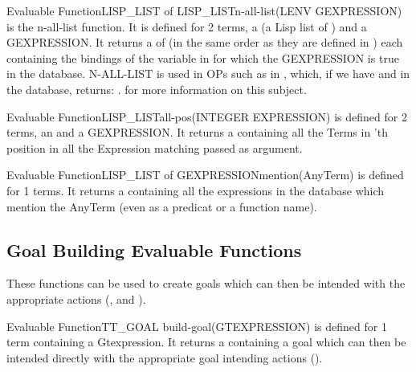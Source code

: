 \begin{typeefa}{Evaluable Function}{LISP\_LIST of LISP\_LIST}{n-all-list}{(LENV GEXPRESSION)}
is the n-all-list function. It is defined for 2 terms, a 
(a Lisp list of
) and a GEXPRESSION. It returns a  of
 (in the same order as they are defined in ) each
containing the bindings of the variable in  for which the
GEXPRESSION is true in the database.  N-ALL-LIST is used in OPs such as in
, which, if we have
 and  in the database, returns: .  for more
information on this subject. 
\end{typeefa}

\begin{typeefa}{Evaluable Function}{LISP\_LIST}{all-pos}{(INTEGER EXPRESSION)}
is defined for 2 terms, an  and a
GEXPRESSION.  It returns a  containing all the Terms in
'th position in all the Expression matching 
passed as argument.
\end{typeefa}

\begin{typeefa}{Evaluable Function}{LISP\_LIST of GEXPRESSION}{mention}{(AnyTerm)}
is defined for 1 terms.  It returns a  containing all the
expressions in the database which mention the AnyTerm (even as a predicat or a
function name).
\end{typeefa}

\subsection{Goal Building Evaluable Functions}

These functions can be used to create goals which can then be intended with the
appropriate actions (, and  ). 

\begin{typeefa}{Evaluable Function}{TT\_GOAL} {build-goal}{(GTEXPRESSION)}
is defined for 1 term containing a Gtexpression. It returns a
 containing a goal which can then be intended directly with the
appropriate goal intending actions ().
\end{typeefa}

